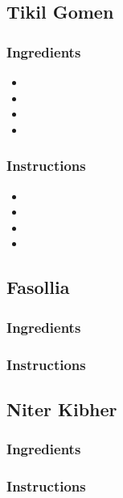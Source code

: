 \documentclass[11pt]{article}
\begin{document}
\subsection{Tikil Gomen}
\label{sec:org9f58479}
\subsubsection*{Ingredients}
\label{sec:orgd37d107}
\begin{itemize}
\item 

\item 

\item 

\item 
\end{itemize}
\subsubsection*{Instructions}
\label{sec:org3c632c7}
\begin{itemize}
\item 

\item 

\item 

\item 
\end{itemize}
\subsection{Fasollia}
\label{sec:org73dd27e}
\subsubsection*{Ingredients}
\label{sec:org3412d0a}
\subsubsection*{Instructions}
\label{sec:orgc9d3ba7}
\subsection{Niter Kibher}
\label{sec:orgab1ba2d}
\subsubsection*{Ingredients}
\label{sec:org03c1a91}
\subsubsection*{Instructions}
\label{sec:orgbe49045}
\end{document}
